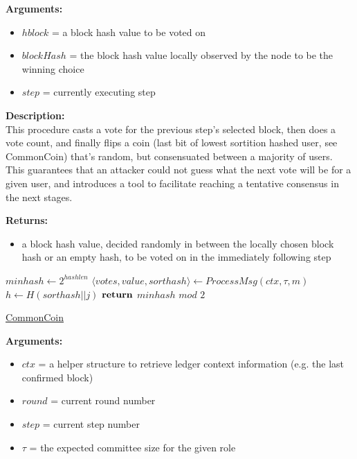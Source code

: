 \documentclass[10pt,a4paper]{article}
\begin{document}
\noindent \textbf{Arguments:}
\begin{itemize}
    \item $hblock$ = a block hash value to be voted on
    \item $blockHash$ = the block hash value locally observed by the node to be the winning choice
    \item $step$ = currently executing step
  \end{itemize}

\noindent \textbf{Description:}\\
This procedure casts a vote for the previous step's selected block, then does a vote count,
and finally flips a coin (last bit of lowest sortition hashed user, see CommonCoin) that's random,
but consensuated between a majority of users. This guarantees that an attacker could not guess what the
next vote will be for a given user, and introduces a tool to facilitate reaching a tentative consensus in the next stages.

\noindent \textbf{Returns:}
\begin{itemize}
    \item a block hash value, decided randomly in between the locally chosen block hash or an empty hash, to be voted on
    in the immediately following step
  \end{itemize}


\begin{algorithm}[H]
    \begin{algorithmic}[H]

    \State $minhash \gets 2^{hashlen}$
        \State $\langle votes,value,sorthash\rangle \gets ProcessMsg(ctx,\tau,m)$
                \State $h \gets H(sorthash||j)$
        \EndFor
    \EndFor
    $\Return$ $minhash$ $mod$ $2$
    \EndFunction
    \end{algorithmic}
    \caption{\underline{CommonCoin}}
\end{algorithm}


\noindent \textbf{Arguments:}
\begin{itemize}
    \item $ctx$ = a helper structure to retrieve ledger context information (e.g. the last confirmed block)
    \item $round$ = current round number
    \item $step$ = current step number
    \item $\tau$ = the expected committee size for the given role
  \end{itemize}
\end{document}
